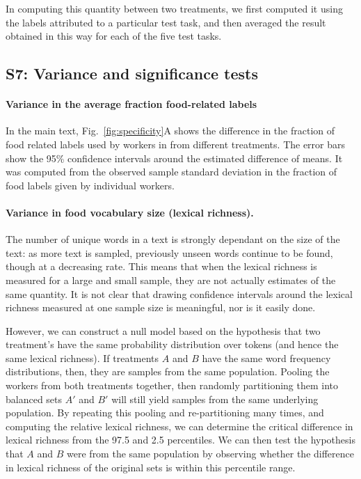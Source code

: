 \documentclass[12pt]{article}
\begin{document}
In computing this quantity between two treatments, we first computed it 
using the labels attributed to a particular test task, and then
averaged the result obtained in this way for each of the five test tasks.

\subsection*{S7: Variance and significance tests}

	\paragraph{Variance in the average fraction food-related labels}
	In the main text, Fig.~\ref{fig:specificity}A shows the difference in 
	the fraction of food related labels used by workers in from different 
	treatments.  The error bars show the 95\% confidence intervals around 
	the estimated difference of means.  It was computed from the
	observed sample standard deviation in the fraction of food labels given
	by individual workers.

	\paragraph{Variance in food vocabulary size (lexical richness).}
	The number of unique words in a text is strongly dependant on the size
	of the text: as more text is sampled, previously unseen words continue
	to be found, though at a decreasing rate.  This means that when the 
	lexical richness is measured for a large and small sample, they are not 
	actually estimates of the same quantity.  It is not clear that drawing 
	confidence intervals around the lexical richness measured at one sample 
	size is meaningful, nor is it easily done.

	However, we can construct a null model based on the hypothesis that
	two treatment's have the same probability distribution over tokens
	(and hence the same lexical richness). If treatments $A$ and $B$ have
	the same word frequency distributions, then, they are samples from
	the same population.  Pooling the workers from both treatments together,
	then randomly partitioning them into balanced sets $A'$ and $B'$ will
	still yield samples from the same underlying population.  By repeating 
	this pooling and re-partitioning many times, and computing the 
	relative lexical richness, we can determine the critical difference in
	lexical richness from the 97.5 and 2.5 percentiles.  We can then test 
	the hypothesis that $A$ and $B$ were from the same population by 
	observing whether the difference in lexical richness of the original 
	sets is within this percentile range.
	
\end{document}
